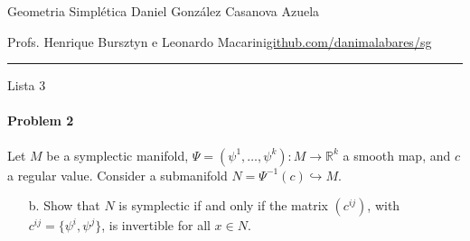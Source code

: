 
%



\begin{minipage}{\textwidth}
	\begin{minipage}{1\textwidth}
		Geometria Simpl\'etica \hfill Daniel González Casanova Azuela
		
		{\small Profs. Henrique Bursztyn e Leonardo Macarini\hfill\href{https://github.com/danimalabares/sg}{github.com/danimalabares/sg}}
	\end{minipage}
\end{minipage}\vspace{.2cm}\hrule

\vspace{10pt}
{\huge Lista 3}

\paragraph{Problem 2} Let $M$ be a symplectic manifold, $\Psi=(\psi^1,\ldots,\psi^k):M\to \mathbb{R}^{k}$ a smooth map, and $c$ a regular value. Consider a submanifold $N=\Psi^{-1}(c)\hookrightarrow M$.
\begin{enumerate}[label=\alph*.]
	
	\item[b.] Show that $N$ is symplectic if and only if the matrix $(c^{ij})$, with $c^{ij}=\{\psi^i,\psi^j\}$, is invertible for all $x\in N$.\end{enumerate}

